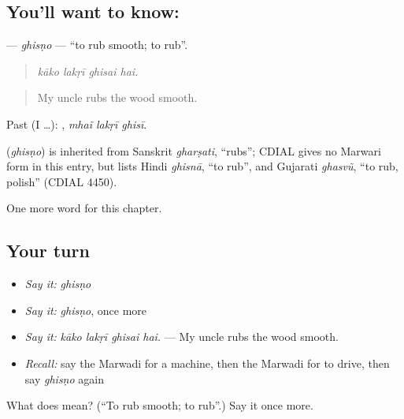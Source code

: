 \subsection*{You'll want to know: }
\textbf{} — \emph{ghisṇo} — \textquotedblleft{}to rub smooth; to rub\textquotedblright{}.

\begin{quote}
   
\end{quote}

\begin{quote}
\emph{kāko lakṛī ghisai hai.}
\end{quote}

\begin{quote}
My uncle rubs the wood smooth.
\end{quote}

Past (I …):   , \emph{mhaĩ lakṛī ghisī}.

\begin{cousinweb}
\textbf{} (\emph{ghisṇo}) is inherited from Sanskrit \emph{gharṣati}, \textquotedblleft{}rubs\textquotedblright{}; CDIAL gives no Marwari form in this entry, but lists Hindi \emph{ghisnā}, \textquotedblleft{}to rub\textquotedblright{}, and Gujarati \emph{ghasvũ}, \textquotedblleft{}to rub, polish\textquotedblright{} (CDIAL 4450).
\end{cousinweb}

\begin{grammarlens}[title={What you've built}]
One more word for this chapter.
\end{grammarlens}

\subsection*{Your turn}
\begin{itemize}
\raggedright
  \item \emph{Say it:} \emph{ghisṇo}
  \item \emph{Say it:} \emph{ghisṇo}, once more
  \item \emph{Say it:} \emph{kāko lakṛī ghisai hai.} — My uncle rubs the wood smooth.
  \item \emph{Recall:} say the Marwadi for a machine, then the Marwadi for to drive, then say \emph{ghisṇo} again
\end{itemize}

\begin{tcolorbox}[breakable,colback=teal!4,colframe=teal!35!black,title={Before you move on}]
What does  mean? (\textquotedblleft{}To rub smooth; to rub\textquotedblright{}.) Say it once more.
\end{tcolorbox}
